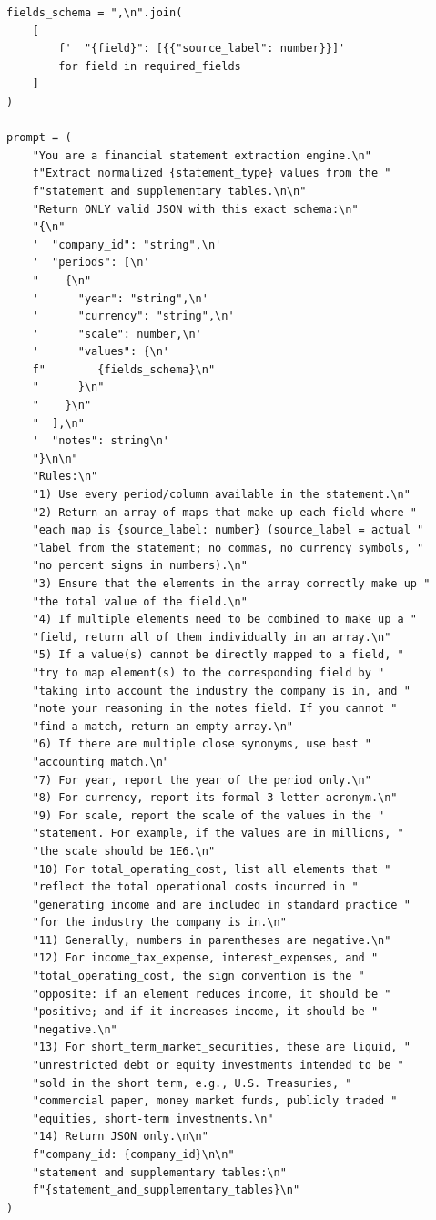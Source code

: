 \documentclass[12pt,a4paper]{article}
\begin{document}
\begin{lstlisting}[style=python, caption={Step~5 prompt (improved): requiring source labels to prevent hallucination}, label=lst:prompt_step5_improved]
fields_schema = ",\n".join(
    [
        f'  "{field}": [{{"source_label": number}}]'
        for field in required_fields
    ]
)

prompt = (
    "You are a financial statement extraction engine.\n"
    f"Extract normalized {statement_type} values from the "
    f"statement and supplementary tables.\n\n"
    "Return ONLY valid JSON with this exact schema:\n"
    "{\n"
    '  "company_id": "string",\n'
    '  "periods": [\n'
    "    {\n"
    '      "year": "string",\n'
    '      "currency": "string",\n'
    '      "scale": number,\n'
    '      "values": {\n'
    f"        {fields_schema}\n"
    "      }\n"
    "    }\n"
    "  ],\n"
    '  "notes": string\n'
    "}\n\n"
    "Rules:\n"
    "1) Use every period/column available in the statement.\n"
    "2) Return an array of maps that make up each field where "
    "each map is {source_label: number} (source_label = actual "
    "label from the statement; no commas, no currency symbols, "
    "no percent signs in numbers).\n"
    "3) Ensure that the elements in the array correctly make up "
    "the total value of the field.\n"
    "4) If multiple elements need to be combined to make up a "
    "field, return all of them individually in an array.\n"
    "5) If a value(s) cannot be directly mapped to a field, "
    "try to map element(s) to the corresponding field by "
    "taking into account the industry the company is in, and "
    "note your reasoning in the notes field. If you cannot "
    "find a match, return an empty array.\n"
    "6) If there are multiple close synonyms, use best "
    "accounting match.\n"
    "7) For year, report the year of the period only.\n"
    "8) For currency, report its formal 3-letter acronym.\n"
    "9) For scale, report the scale of the values in the "
    "statement. For example, if the values are in millions, "
    "the scale should be 1E6.\n"
    "10) For total_operating_cost, list all elements that "
    "reflect the total operational costs incurred in "
    "generating income and are included in standard practice "
    "for the industry the company is in.\n"
    "11) Generally, numbers in parentheses are negative.\n"
    "12) For income_tax_expense, interest_expenses, and "
    "total_operating_cost, the sign convention is the "
    "opposite: if an element reduces income, it should be "
    "positive; and if it increases income, it should be "
    "negative.\n"
    "13) For short_term_market_securities, these are liquid, "
    "unrestricted debt or equity investments intended to be "
    "sold in the short term, e.g., U.S. Treasuries, "
    "commercial paper, money market funds, publicly traded "
    "equities, short-term investments.\n"
    "14) Return JSON only.\n\n"
    f"company_id: {company_id}\n\n"
    "statement and supplementary tables:\n"
    f"{statement_and_supplementary_tables}\n"
)
\end{lstlisting}
\end{document}
